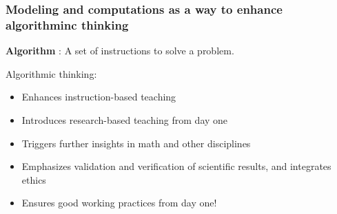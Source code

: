 \documentclass{beamer}
\begin{document}
\begin{frame}
\frametitle{Modeling and computations as a way to enhance algorithminc thinking}

\pause
\begin{block}{}
\textbf{Algorithm} :
A set of instructions to solve a problem.
\end{block}

\begin{block}{Algorithmic thinking: }
\begin{itemize}
\item Enhances instruction-based teaching

\item Introduces research-based teaching  from day one

\item Triggers further insights in math and other disciplines

\item Emphasizes validation and verification of scientific results, and integrates ethics

\item Ensures good working practices from day one!
\end{itemize}

\noindent
\end{block}
\end{frame}
\end{document}
